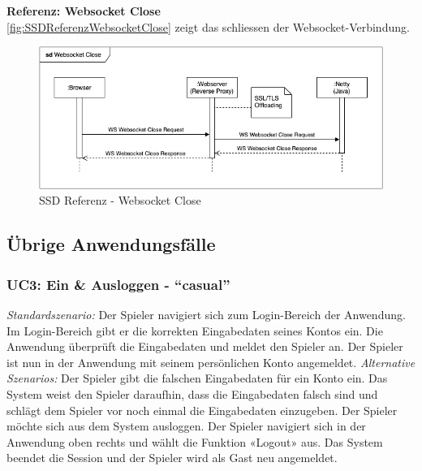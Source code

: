 \documentclass[11pt,ngerman]{article}
\newcommand{\quotes}[1]{``#1''}
\begin{document}
    \noindent \textbf{Referenz: \Gls{Websocket} Close} \\
    \autoref{fig:SSDReferenzWebsocketClose} zeigt das schliessen der \Gls{Websocket}-Verbindung.
    \begin{figure}[H]
    	\centering
    	\includegraphics[scale=0.6]{figures/SSD-Websocket_Close.png}
    	\caption{SSD Referenz - \Gls{Websocket} Close}
    	\label{fig:SSDReferenzWebsocketClose}
    \end{figure}

    \subsection{Übrige Anwendungsfälle}
    \subsubsection{UC3: Ein \& Ausloggen  - \quotes{casual}}
    \label{sssec:UC3EinAusloggen}
    \begin{tcolorbox}[enhanced, breakable, sharp corners, width=\dimexpr\textwidth-15mm\relax ,enlarge left by=10mm ,fontupper=\linespread{1.1}\selectfont, boxrule=1pt, title={UC3: Ein \& Ausloggen }, colback=white, colframe=gray!22, coltitle=black]
    	\textit{Standardszenario:} Der Spieler navigiert sich zum Login-Bereich der Anwendung. Im Login-Bereich gibt er die korrekten Eingabedaten seines Kontos ein. Die Anwendung überprüft die Eingabedaten und meldet den Spieler an. Der
    	Spieler ist nun in der Anwendung mit seinem persönlichen Konto angemeldet.\newline
    	\newline
    	\textit{Alternative Szenarios:} \newline
    	Der Spieler gibt die falschen Eingabedaten für ein Konto ein. Das System weist den Spieler
    	daraufhin, dass die Eingabedaten falsch sind und schlägt dem Spieler vor noch einmal die  Eingabedaten einzugeben. \newline
    	\newline
    	Der Spieler möchte sich aus dem System ausloggen. Der Spieler navigiert sich in der Anwendung oben rechts und wählt die Funktion «Logout» aus. Das System beendet die Session und der Spieler wird als Gast neu angemeldet.
    \end{tcolorbox}
\end{document}
